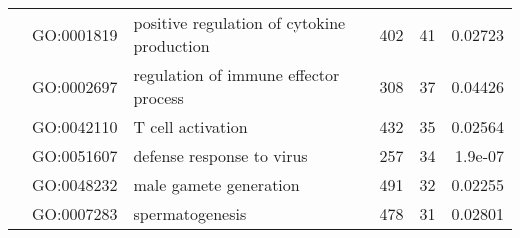 \begin{landscape}
\begin{longtable}[c]{@{}lllccr@{}}
		                                               & GO:0001819                         & positive regulation of cytokine production                                & 402                                                                & 41                                                                   & 0.02723                                                                                  \\
		                                               & GO:0002697                         & regulation of immune effector process                                     & 308                                                                & 37                                                                   & 0.04426                                                                                  \\
		                                               & GO:0042110                         & T cell activation                                                         & 432                                                                & 35                                                                   & 0.02564                                                                                  \\
		                                               & GO:0051607                         & defense response to virus                                                 & 257                                                                & 34                                                                   & 1.9e-07                                                                                  \\
		                                               & GO:0048232                         & male gamete generation                                                    & 491                                                                & 32                                                                   & 0.02255                                                                                  \\
		                                               & GO:0007283                         & spermatogenesis                                                           & 478                                                                & 31                                                                   & 0.02801                                                                                  \\

\end{longtable}
\end{landscape}
